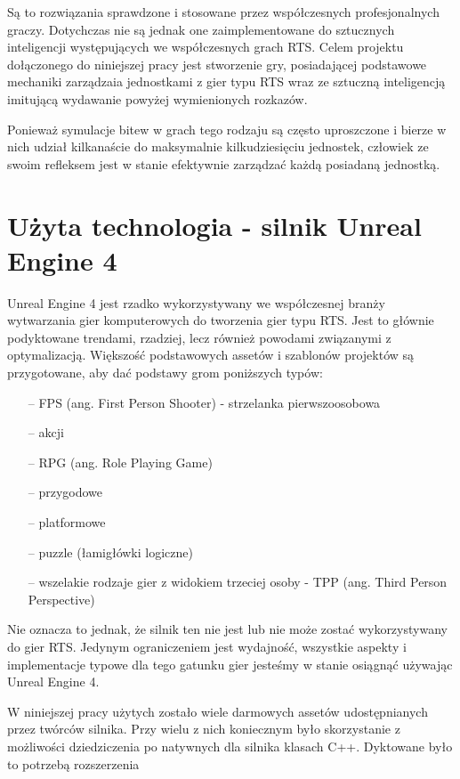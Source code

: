 \documentclass[12pt]{report}
\begin{document}
Są to rozwiązania sprawdzone i stosowane przez współczesnych profesjonalnych graczy. Dotychczas nie są jednak one zaimplementowane do sztucznych inteligencji występujących we współczesnych grach  RTS. Celem projektu dołączonego do niniejszej pracy jest stworzenie gry, posiadającej podstawowe mechaniki zarządzaia jednostkami z gier typu RTS wraz ze sztuczną inteligencją imitującą wydawanie powyżej wymienionych rozkazów.


Ponieważ symulacje bitew w grach tego rodzaju są często uproszczone i bierze w nich udział kilkanaście do maksymalnie kilkudziesięciu jednostek, człowiek ze swoim refleksem jest w stanie efektywnie zarządzać każdą posiadaną jednostką.




\chapter{Użyta technologia - silnik Unreal Engine 4}

Unreal Engine 4 jest rzadko wykorzystywany we współczesnej branży wytwarzania gier komputerowych do tworzenia gier typu RTS. Jest to głównie podyktowane trendami, rzadziej, lecz również powodami związanymi z optymalizacją. Większość podstawowych assetów i szablonów projektów są przygotowane, aby dać podstawy grom poniższych typów:
\begin{itemize}
\item[--] FPS (ang. First Person Shooter) - strzelanka pierwszoosobowa
\item[--] akcji
\item[--] RPG (ang. Role Playing Game)
\item[--] przygodowe
\item[--] platformowe
\item[--] puzzle (łamigłówki logiczne)
\item[--] wszelakie rodzaje gier z widokiem trzeciej osoby - TPP (ang. Third Person Perspective)  
\end{itemize}



Nie oznacza to jednak, że silnik ten nie jest lub nie może zostać wykorzystywany do gier RTS. Jedynym ograniczeniem jest wydajność, wszystkie aspekty i implementacje typowe dla tego gatunku gier jesteśmy w stanie osiągnąć używając Unreal Engine 4. 

W niniejszej pracy użytych zostało wiele darmowych assetów udostępnianych przez twórców silnika. Przy wielu z nich koniecznym było skorzystanie z możliwości dziedziczenia po natywnych dla silnika klasach C++. Dyktowane było to potrzebą rozszerzenia 
\end{document}
